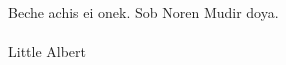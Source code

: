 \noindent
{
\small
Beche achis ei onek. Sob Noren Mudir doya.
}\\\\
\vspace*{\fill}
\hfill Little Albert
